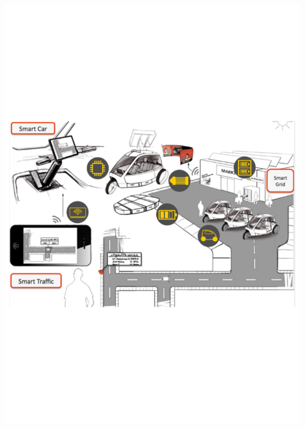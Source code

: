\begin{frame}[t]
\begin{columns}
\begin{column}{0.6\textwidth}
      \includegraphics[width=1\textwidth]{pics/acmFraunhofer}
    \end{column}
  \end{columns}
\end{frame}

